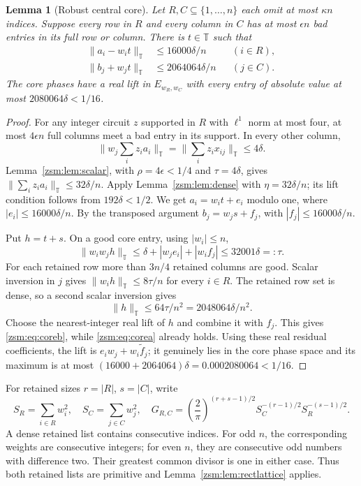 \documentclass[11pt]{article}
\newtheorem{lemma}[theorem]{Lemma}
\theoremstyle{definition}\newtheorem{definition}[theorem]{Definition}
\theoremstyle{remark}\newtheorem{remark}[theorem]{Remark}
\newcommand{\T}{\mathbb T}
\newcommand{\normT}[1]{\lVert #1\rVert_{\T}}
\begin{document}
\begin{lemma}[Robust central core]\label{zsm:lem:core}
Let $R,C\subseteq\{1,\ldots,n\}$ each omit at most $\kappa n$ indices.
Suppose every row in $R$ and every column in $C$ has at most $\epsilon n$ bad
entries in its full row or column. There is $t\in\T$ such that
\begin{align}
 \normT{a_i-w_it}&\le16000\delta/n&& (i\in R),\label{zsm:eq:corea}\\
 \normT{b_j+w_jt}&\le2064064\delta/n&& (j\in C).\label{zsm:eq:coreb}
\end{align}
The core phases have a real lift in $E_{w_R,w_C}$ with every entry of absolute
value at most $2080064\delta<1/16$.
\end{lemma}
\begin{proof}
For any integer circuit $z$ supported in $R$ with $\ell^1$ norm at most four,
at most $4\epsilon n$ full columns meet a bad entry in its support. In every
other column,
\[
 \normT{w_j\sum_i z_i a_i}
 =\normT{\sum_i z_i x_{ij}}\le4\delta.
\]
Lemma~\ref{zsm:lem:scalar}, with $\rho=4\epsilon<1/4$ and $\tau=4\delta$, gives
$\normT{\sum_i z_i a_i}\le32\delta/n$. Apply Lemma~\ref{zsm:lem:dense} with
$\eta=32\delta/n$; its lift condition follows from $192\delta<1/2$. We get
$a_i=w_it+e_i$ modulo one, where $|e_i|\le16000\delta/n$. By the transposed
argument $b_j=w_js+f_j$, with $|f_j|\le16000\delta/n$.

Put $h=t+s$. On a good core entry, using $|w_i|\le n$,
\[
 \normT{w_iw_jh}\le\delta+|w_je_i|+|w_if_j|
 \le32001\delta=:\tau.
\]
For each retained row more than $3n/4$ retained columns are good. Scalar
inversion in $j$ gives $\normT{w_ih}\le8\tau/n$ for every $i\in R$.
The retained row set is dense, so a second scalar inversion gives
\[
 \normT{h}\le64\tau/n^2=2048064\delta/n^2.
\]
Choose the nearest-integer real lift of $h$ and combine it with $f_j$. This
gives \eqref{zsm:eq:coreb}, while \eqref{zsm:eq:corea} already holds. Using these real
residual coefficients, the lift is $e_iw_j+w_i\widetilde f_j$; it genuinely
lies in the core phase space and its maximum is at most
$(16000+2064064)\delta=0.0002080064<1/16$.
\end{proof}

For retained sizes $r=|R|$, $s=|C|$, write
\[
 S_R=\sum_{i\in R}w_i^2,\quad S_C=\sum_{j\in C}w_j^2,\quad
 G_{R,C}=\left(\frac2\pi\right)^{(r+s-1)/2}
 S_C^{-(r-1)/2}S_R^{-(s-1)/2}.
\]
A dense retained list contains consecutive indices. For odd $n$, the
corresponding weights are consecutive integers; for even $n$, they are
consecutive odd numbers with difference two. Their greatest common divisor is
one in either case. Thus both retained lists are primitive and
Lemma~\ref{zsm:lem:rectlattice} applies.
\end{document}
